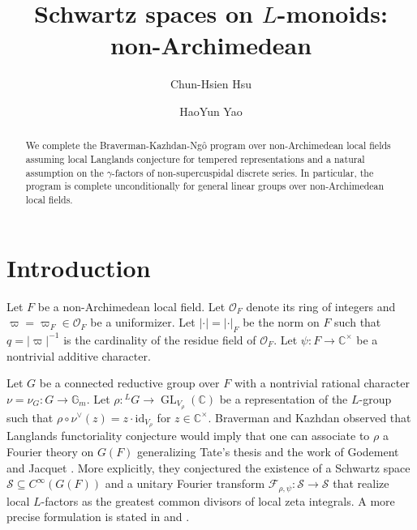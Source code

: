 \documentclass[10pt]{amsart}
\theoremstyle{definition}
\numberwithin{equation}{section}
\DeclareMathOperator{\GL}{\mathrm{GL}}
\numberwithin{equation}{subsection}
\begin{document}
\author{Chun-Hsien Hsu}
\address{Department of Mathematics\\
University of Chicago\\
Chicago, IL 60637}


\author{HaoYun Yao}
\address{Department of Mathematics\\
Duke University\\
Durham, NC 27708}


\title{Schwartz spaces on $L$-monoids: non-Archimedean}

\begin{abstract}
    We complete the Braverman-Kazhdan-Ng\^{o} program over non-Archimedean local fields assuming local Langlands conjecture for tempered representations and a natural assumption on the $\gamma$-factors of non-supercuspidal discrete series. In particular, the program is complete unconditionally for general linear groups over non-Archimedean local fields.
\end{abstract}

\maketitle 
\tableofcontents

\section{Introduction} 

Let $F$ be a non-Archimedean local field. Let $\mathcal{O}_F$ denote its ring of integers and $\varpi=\varpi_F\in \mathcal{O}_F$ be a uniformizer. Let $|\cdot|=|\cdot|_F$ be the norm on $F$ such that $q=|\varpi|^{-1}$ is the cardinality of the residue field of $\mathcal{O}_F$. Let $\psi:F\to\mathbb{C}^\times$ be a nontrivial additive character.

Let $G$ be a connected reductive group over $F$ with a nontrivial rational character $\nu=\nu_G:G\longrightarrow\mathbb{G}_m$. Let $\rho:{}^LG\to \GL_{V_\rho}(\mathbb{C})$ be a representation of the $L$-group such that $\rho\circ\nu^\vee(z) =z\cdot\mathrm{id}_{V_\rho}$ for $z\in\mathbb{C}^\times.$ Braverman and Kazhdan \cite{BK-lifting} observed that Langlands functoriality conjecture would imply that one can associate to $\rho$ a Fourier theory on $G(F)$ generalizing Tate's thesis and the work of Godement and Jacquet \cite{GodementJacquetBook}. More explicitly, they conjectured the existence of a Schwartz space $\mathcal{S}\subseteq C^\infty(G(F))$ and a unitary Fourier transform $\mathcal{F}_{\rho,\psi}:\mathcal{S}\longrightarrow \mathcal{S}$ that realize local $L$-factors as the greatest common divisors of local zeta integrals. A more precise formulation is stated in  \cite[\S4]{Ngo:Hankel} and \cite[\S2]{Luo:Ngo}. 
\end{document}
